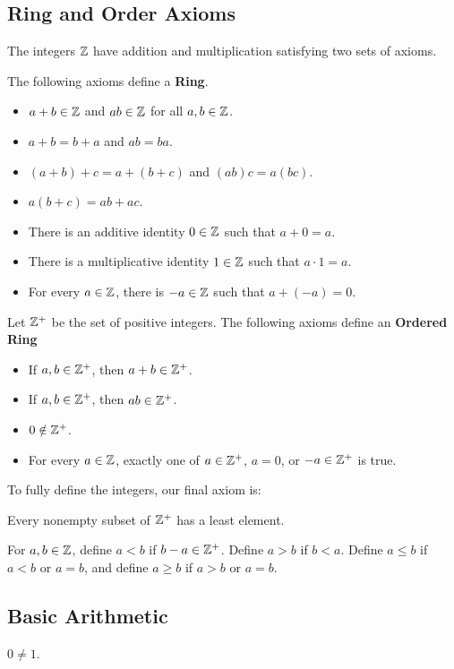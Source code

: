 \subsection{Ring and Order Axioms}
The integers $\mathbb{Z}$ have addition and multiplication satisfying two sets of axioms.
\begin{definition}
    The following axioms define a \textbf{Ring}.
\begin{itemize}
    \item $a+b\in\mathbb{Z}$ and $ab\in\mathbb{Z}$ for all $a,b\in\mathbb{Z}$.
    \item $a+b=b+a$ and $ab=ba$.
    \item $(a+b)+c=a+(b+c)$ and $(ab)c=a(bc)$.
    \item $a(b+c)=ab+ac$.
    \item There is an additive identity $0\in\mathbb{Z}$ such that $a+0=a$.
    \item There is a multiplicative identity $1\in\mathbb{Z}$ such that $a\cdot1=a$.
    \item For every $a\in\mathbb{Z}$, there is $-a\in\mathbb{Z}$ such that $a+(-a)=0$.
\end{itemize}
\end{definition}

\begin{definition}
Let $\mathbb{Z}^+$ be the set of positive integers. The following axioms define an \textbf{Ordered Ring}
\begin{itemize}
    \item If $a,b\in\mathbb{Z}^+$, then $a+b\in\mathbb{Z}^+$.
    \item If $a,b\in\mathbb{Z}^+$, then $ab\in\mathbb{Z}^+$.
    \item $0\notin\mathbb{Z}^+$.
    \item For every $a\in\mathbb{Z}$, exactly one of $a\in\mathbb{Z}^+$, $a=0$, or $-a\in\mathbb{Z}^+$ is true.
\end{itemize}
\end{definition}
To fully define the integers, our final axiom is:
\begin{definition}
Every nonempty subset of $\mathbb{Z}^+$ has a least element.
\end{definition}

\begin{definition}
For $a,b\in\mathbb{Z}$, define $a<b$ if $b-a\in\mathbb{Z}^+$. Define $a>b$ if $b<a$. Define $a\leq b$ if $a<b$ or $a=b$, and define $a\geq b$ if $a>b$ or $a=b$.
\end{definition}

\subsection{Basic Arithmetic}
\begin{lemma}
$0\neq1$.
\end{lemma}


